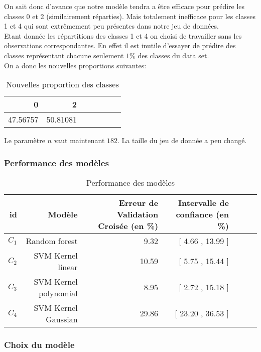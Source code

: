 \documentclass{article}
\begin{document}
On sait donc d'avance que notre modèle tendra a être efficace pour prédire les classes 0 et 2 (similairement réparties). Mais totalement inefficace pour les classes 1 et 4 qui sont extrêmement peu présentes dans notre jeu de données.\\

Etant donnée les répartitions des classes 1 et 4 on choisi de travailler sans les observations correspondantes. En effet il est inutile d'essayer de prédire des classes représentant chacune seulement $1\%$ des classes du data set.\\

On a donc les nouvelles proportions suivantes:

\begin{table}[ht]
\centering
\captionsetup{justification=centering}
    \caption{Nouvelles proportion des classes}
\begin{tabular}{rrrrrrr}
  \hline
 0 & 2 \\ 
  \hline
47.56757 & 50.81081  \\
\end{tabular}
\end{table}

Le paramètre $n$ vaut maintenant $182$. La taille du jeu de donnée a peu changé.

\subsubsection{Performance des modèles}

\begin{table}[H]
\centering
\captionsetup{justification=centering}
    \caption{Performance des modèles}
\begin{tabular}{rrrrrrr}
  \hline
  id & Modèle & Erreur de Validation Croisée (en \%) & Intervalle de confiance (en \%)\\ 
  \hline
$C_{1}$ & Random forest & 9.32 & [ 4.66 , 13.99 ]  \\
$C_{2}$ &SVM Kernel linear & 10.59 & [ 5.75 , 15.44 ] \\
$C_{3}$ &SVM Kernel polynomial & 8.95 & [ 2.72 , 15.18 ]  \\
$C_{4}$ &SVM Kernel Gaussian & 29.86 & [ 23.20 , 36.53 ]   \\
   
\end{tabular}
\end{table}

\subsubsection{Choix du modèle}
\end{document}
